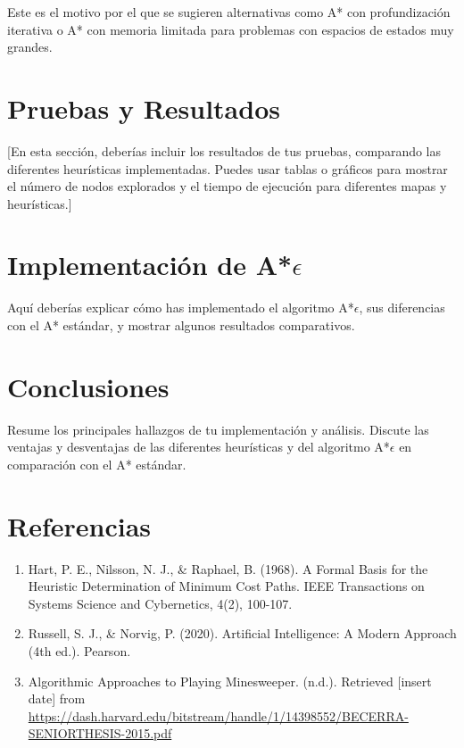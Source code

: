 \documentclass[a4paper,12pt]{article}
\begin{document}
	Este es el motivo por el que se sugieren alternativas como A* con profundización iterativa o A* con memoria limitada para problemas con espacios de estados muy grandes.
	
	\section{Pruebas y Resultados}
	[En esta sección, deberías incluir los resultados de tus pruebas, comparando las diferentes heurísticas implementadas. Puedes usar tablas o gráficos para mostrar el número de nodos explorados y el tiempo de ejecución para diferentes mapas y heurísticas.]
	
	\section{Implementación de A*$\epsilon$}
	Aquí deberías explicar cómo has implementado el algoritmo A*$\epsilon$, sus diferencias con el A* estándar, y mostrar algunos resultados comparativos.
	
	\section{Conclusiones}
	Resume los principales hallazgos de tu implementación y análisis. Discute las ventajas y desventajas de las diferentes heurísticas y del algoritmo A*$\epsilon$ en comparación con el A* estándar.

	
	\section{Referencias}
	\begin{enumerate}
		\item Hart, P. E., Nilsson, N. J., \& Raphael, B. (1968). A Formal Basis for the Heuristic Determination of Minimum Cost Paths. IEEE Transactions on Systems Science and Cybernetics, 4(2), 100-107.
		\item Russell, S. J., \& Norvig, P. (2020). Artificial Intelligence: A Modern Approach (4th ed.). Pearson.
		\item Algorithmic Approaches to Playing Minesweeper. (n.d.). Retrieved [insert date] from \url{https://dash.harvard.edu/bitstream/handle/1/14398552/BECERRA-SENIORTHESIS-2015.pdf}
	\end{enumerate}
	
\end{document}
